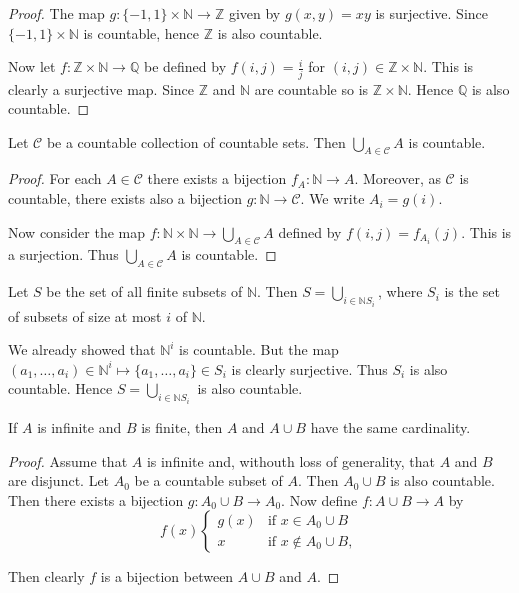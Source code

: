 \begin{proof}[Proof]
    The map $ g: \{-1,1\} \times \mathbb{N} \to \mathbb{Z} $ given by $ g(x,y) = xy $ is surjective. Since $ \{-1,1\} \times \mathbb{N} $ is countable, hence $\mathbb{Z}$ is also countable.

    Now let $ f: \mathbb{Z} \times \mathbb{N} \to \mathbb{Q} $ be defined by $ f(i,j) = \frac{i}{j}$ for $ (i,j) \in \mathbb{Z} \times \mathbb{N} $. This is clearly a surjective map.
    Since $\mathbb{Z}$ and $\mathbb{N}$ are countable so is $\mathbb{Z} \times \mathbb{N}$. Hence $\mathbb{Q}$ is also countable.
\end{proof}

\begin{theorem}
    Let $\mathscr{C}$ be a countable collection of countable sets. Then
    $ \bigcup_{A \in \mathscr{C}}A $ is countable.
\end{theorem}
\begin{proof}[Proof]
    For each $ A \in \mathscr{C} $ there exists a bijection
    $ f_A : \mathbb{N} \to A $. Moreover, as $\mathscr{C}$ is countable, there
    exists also a bijection $ g: \mathbb{N} \to \mathscr{C} $. We write
    $ A_i = g(i) $.

    Now consider the map $ f: \mathbb{N} \times \mathbb{N} \to \bigcup_{A\in\mathscr{C}}A $
    defined by $ f(i,j) = f_{A_i}(j) $. This is a surjection. Thus
    $ \bigcup_{A\in\mathscr{C}}A $ is countable.
\end{proof}
\begin{example}
Let $S$ be the set of all finite subsets of $\mathbb{N}$. Then $S = \bigcup_{i\in\mathbb{N}S_i}$, where $S_i$ is the set of subsets of size at most $i$ of $\mathbb{N}$. \par
We already showed that $ \mathbb{N}^i $ is countable. But the map $ (a_1,\dots,a_i) \in \mathbb{N}^i \mapsto \{a_1,\dots, a_i\} \in S_i $ is clearly surjective.
Thus $S_i$ is also countable. Hence $ S = \bigcup_{i\in\mathbb{N}S_i} $ is also countable.
\end{example}

\begin{proposition}
    If $A$ is infinite and $B$ is finite, then $A$ and $A \cup B$ have the same cardinality.
\end{proposition}

\begin{proof}[Proof]
    Assume that $A$ is infinite and, withouth loss of generality, that $A$ and
    $B$ are disjunct. Let $A_0$ be a countable subset of $A$. Then $A_0 \cup B$
    is also countable. Then there exists a bijection $ g: A_0 \cup B \to A_0 $.
    Now define $ f: A \cup B \to A $ by
    $$ f(x) \begin{cases}
        g(x) &\text{if } x \in A_0 \cup B \\
        x &\text{if } x \notin A_0 \cup B,
    \end{cases} $$

    Then clearly $f$ is a bijection between $A \cup B$ and $A$.
\end{proof}

